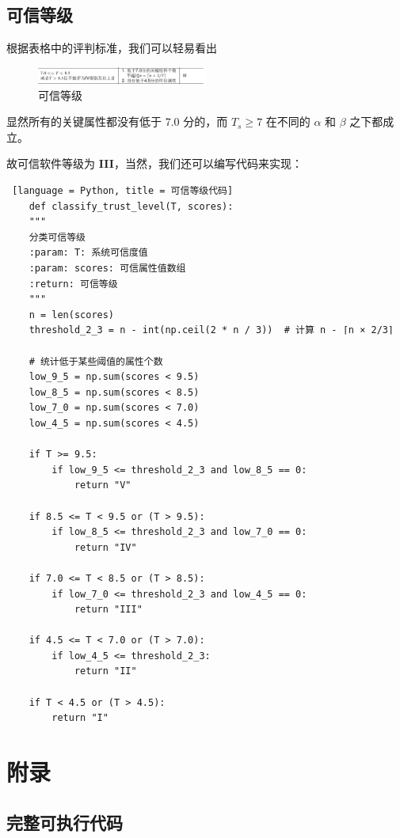 \documentclass[14pt,a4paper,UTF8,twoside]{article}
\begin{document}
\subsection{可信等级}

根据表格中的评判标准，我们可以轻易看出

\begin{figure}[H]
    \centering
    \includegraphics[width = 0.5\textwidth]{img9/direct.png}
    \caption{可信等级}
    \label{fig:trust_level}
\end{figure}

显然所有的关键属性都没有低于 7.0 分的，而 $T_s \ge 7$ 在不同的 $\alpha $ 和 $\beta $ 之下都成立。

故可信软件等级为 \textbf{III}，当然，我们还可以编写代码来实现：

\begin{lstlisting} [language = Python, title = 可信等级代码]
    def classify_trust_level(T, scores):
    """
    分类可信等级
    :param: T: 系统可信度值
    :param: scores: 可信属性值数组
    :return: 可信等级
    """
    n = len(scores)
    threshold_2_3 = n - int(np.ceil(2 * n / 3))  # 计算 n - ⌈n × 2/3⌉

    # 统计低于某些阈值的属性个数
    low_9_5 = np.sum(scores < 9.5)
    low_8_5 = np.sum(scores < 8.5)
    low_7_0 = np.sum(scores < 7.0)
    low_4_5 = np.sum(scores < 4.5)

    if T >= 9.5:
        if low_9_5 <= threshold_2_3 and low_8_5 == 0:
            return "V"

    if 8.5 <= T < 9.5 or (T > 9.5):
        if low_8_5 <= threshold_2_3 and low_7_0 == 0:
            return "IV"

    if 7.0 <= T < 8.5 or (T > 8.5):
        if low_7_0 <= threshold_2_3 and low_4_5 == 0:
            return "III"

    if 4.5 <= T < 7.0 or (T > 7.0):
        if low_4_5 <= threshold_2_3:
            return "II"

    if T < 4.5 or (T > 4.5):
        return "I"
\end{lstlisting}

\section{附录}
\subsection{完整可执行代码}
\end{document}
